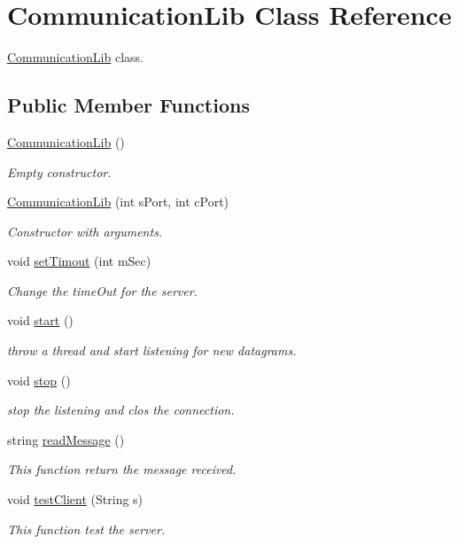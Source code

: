 \hypertarget{class_communication_lib}{\section{Communication\-Lib Class Reference}
\label{class_communication_lib}
}


\hyperlink{class_communication_lib}{Communication\-Lib} class.  


\subsection*{Public Member Functions}
\begin{DoxyCompactItemize}
\item 
\hyperlink{class_communication_lib_a88995ee179197790ce3f14d694ecd2a2}{Communication\-Lib} ()
\begin{DoxyCompactList}\small\item\em Empty constructor. \end{DoxyCompactList}\item 
\hyperlink{class_communication_lib_ab0d8f834a72f744e96bbc8c0f2acb158}{Communication\-Lib} (int s\-Port, int c\-Port)
\begin{DoxyCompactList}\small\item\em Constructor with arguments. \end{DoxyCompactList}\item 
void \hyperlink{class_communication_lib_a0e67a5f5465c6a04c7bda7bec79bc6a6}{set\-Timout} (int m\-Sec)
\begin{DoxyCompactList}\small\item\em Change the time\-Out for the server. \end{DoxyCompactList}\item 
void \hyperlink{class_communication_lib_a5c5fffa4340549546e9929274da1c513}{start} ()
\begin{DoxyCompactList}\small\item\em throw a thread and start listening for new datagrams. \end{DoxyCompactList}\item 
void \hyperlink{class_communication_lib_a322c14edef317eec3dcf24b5c91dcec1}{stop} ()
\begin{DoxyCompactList}\small\item\em stop the listening and clos the connection. \end{DoxyCompactList}\item 
string \hyperlink{class_communication_lib_a19cff7840f216399f333a5caf24923f7}{read\-Message} ()
\begin{DoxyCompactList}\small\item\em This function return the message received. \end{DoxyCompactList}\item 
void \hyperlink{class_communication_lib_afd007743f316982a54593d49b88f5bcc}{test\-Client} (String s)
\begin{DoxyCompactList}\small\item\em This function test the server. \end{DoxyCompactList}\end{DoxyCompactItemize}


